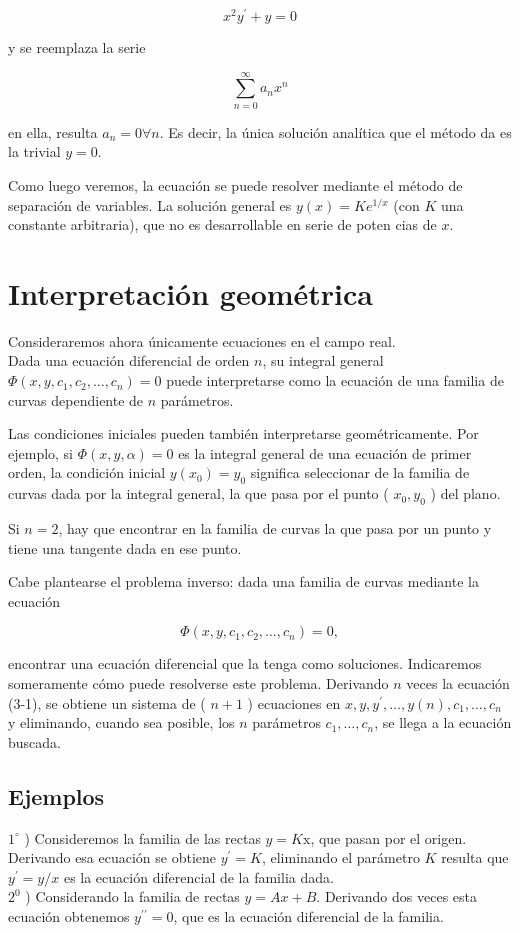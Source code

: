 \documentclass[10pt]{article}
\theoremstyle{plain}
\theoremstyle{definition}
\theoremstyle{remark}
\begin{document}
$$
x^{2} y^{\prime}+y=0
$$

y se reemplaza la serie

$$
\sum_{n=0}^{\infty} a_{n} x^{n}
$$

en ella, resulta $a_{n}=0 \forall n$. Es decir, la única solución analítica que el método da es la trivial $y=0$.

Como luego veremos, la ecuación se puede resolver mediante el método de separación de variables. La solución general es $y(x)=K e^{1 / x}$ (con $K$ una constante arbitraria), que no es desarrollable en serie de poten cias de $x$.

\section{Interpretación geométrica}
Consideraremos ahora únicamente ecuaciones en el campo real.\\
Dada una ecuación diferencial de orden $n$, su integral general $\Phi\left(x, y, c_{1}, c_{2}, \ldots, c_{n}\right)=0$ puede interpretarse como la ecuación de una familia de curvas dependiente de $n$ parámetros.

Las condiciones iniciales pueden también interpretarse geométricamente. Por ejemplo, si $\Phi(x, y, \alpha)=0$ es la integral general de una ecuación de primer orden, la condición inicial $y\left(x_{0}\right)=y_{0}$ significa seleccionar de la familia de curvas dada por la integral general, la que pasa por el punto ( $x_{0}, y_{0}$ ) del plano.

Si $n=2$, hay que encontrar en la familia de curvas la que pasa por un punto y tiene una tangente dada en ese punto.

Cabe plantearse el problema inverso: dada una familia de curvas mediante la ecuación


\begin{equation*}
\Phi\left(x, y, c_{1}, c_{2}, \ldots, c_{n}\right)=0, \tag{3-1}
\end{equation*}


encontrar una ecuación diferencial que la tenga como soluciones. Indicaremos someramente cómo puede resolverse este problema. Derivando $n$ veces la ecuación (3-1), se obtiene un sistema de ( $n+1$ ) ecuaciones en $x, y, y^{\prime}, \ldots, y(n), c_{1}, \ldots, c_{n}$ y eliminando, cuando sea posible, los $n$ parámetros $c_{1}, \ldots, c_{n}$, se llega a la ecuación buscada.

\subsection{Ejemplos}
$1^{\circ}$ ) Consideremos la familia de las rectas $y=K \mathrm{x}$, que pasan por el origen. Derivando esa ecuación se obtiene $y^{\prime}=K$, eliminando el parámetro $K$ resulta que $y^{\prime}=y / x$ es la ecuación diferencial de la familia dada.\\
$2^{0}$ ) Considerando la familia de rectas $y=A x+B$. Derivando dos veces esta ecuación obtenemos $y^{\prime \prime}=0$, que es la ecuación diferencial de la familia.
\end{document}

